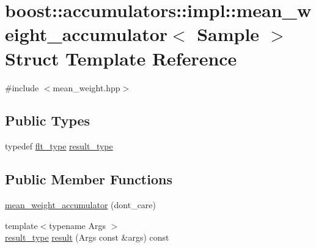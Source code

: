 \hypertarget{structboost_1_1accumulators_1_1impl_1_1mean__weight__accumulator}{\section{boost\-:\-:accumulators\-:\-:impl\-:\-:mean\-\_\-weight\-\_\-accumulator$<$ Sample $>$ Struct Template Reference}
\label{structboost_1_1accumulators_1_1impl_1_1mean__weight__accumulator}
}


{\ttfamily \#include $<$mean\-\_\-weight.\-hpp$>$}

\subsection*{Public Types}
\begin{DoxyCompactItemize}
\item 
typedef \hyperlink{lib_2IceBRG__main_2common_8h_ad0f130a56eeb944d9ef2692ee881ecc4}{flt\-\_\-type} \hyperlink{structboost_1_1accumulators_1_1impl_1_1mean__weight__accumulator_aa801a0036d51f922b4ac392309a2ca37}{result\-\_\-type}
\end{DoxyCompactItemize}
\subsection*{Public Member Functions}
\begin{DoxyCompactItemize}
\item 
\hyperlink{structboost_1_1accumulators_1_1impl_1_1mean__weight__accumulator_a0aa2176eab9ce6eec07f8eca2e29922d}{mean\-\_\-weight\-\_\-accumulator} (dont\-\_\-care)
\item 
{\footnotesize template$<$typename Args $>$ }\\\hyperlink{structboost_1_1accumulators_1_1impl_1_1mean__weight__accumulator_aa801a0036d51f922b4ac392309a2ca37}{result\-\_\-type} \hyperlink{structboost_1_1accumulators_1_1impl_1_1mean__weight__accumulator_a480b0bbb3ad6634179ea7e7e7d4aa7ce}{result} (Args const \&args) const 
\end{DoxyCompactItemize}


